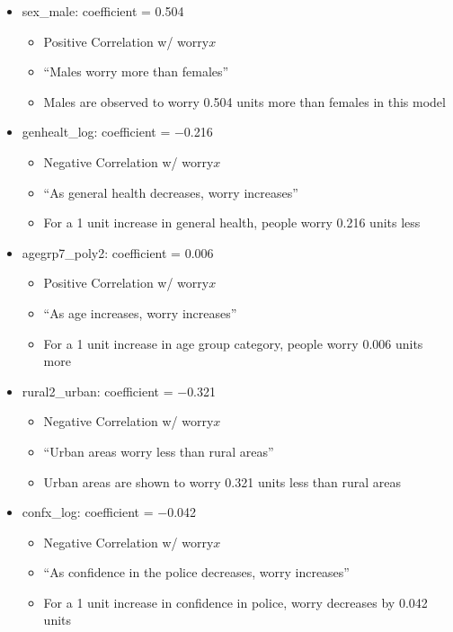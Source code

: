 \documentclass[11pt, english]{article}
\begin{document}
	\begin{itemize}
	\setlength\itemsep{0cm}
		\item sex\_male: coefficient = 0.504
		\begin{itemize}
			\item Positive Correlation w/ worry$x$
			\item ``Males worry more than females''
			\item Males are observed to worry 0.504 units more than females in this model
		\end{itemize}
		\item genhealt\_log: coefficient = $-$0.216
                \begin{itemize}
                        \item Negative Correlation w/ worry$x$
                        \item ``As general health decreases, worry increases''
                        \item For a 1 unit increase in general health, people worry 0.216 units less 
                \end{itemize}
		\item agegrp7\_poly2: coefficient = 0.006
                \begin{itemize}
                        \item Positive Correlation w/ worry$x$
                        \item ``As age increases, worry increases''
                        \item For a 1 unit increase in age group category, people worry 0.006 units more
                \end{itemize}
		\item rural2\_urban: coefficient = $-$0.321
                \begin{itemize}
                        \item Negative Correlation w/ worry$x$
                        \item ``Urban areas worry less than rural areas''
                        \item Urban areas are shown to worry 0.321 units less than rural areas
                \end{itemize}
		\item confx\_log: coefficient = $-$0.042
                \begin{itemize}
                        \item Negative Correlation w/ worry$x$
                        \item ``As confidence in the police decreases, worry increases''
                        \item For a 1 unit increase in confidence in police, worry decreases by 0.042 units
                \end{itemize}
	\end{itemize}
\end{document}
